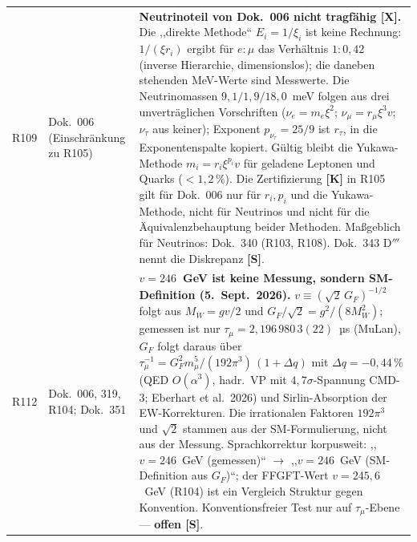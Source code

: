 \begin{longtable}{@{}p{0.9cm}p{3.1cm}p{10.2cm}@{}}
R109 & Dok.~006 (Einschränkung zu R105) & \textbf{Neutrinoteil von Dok.~006 nicht tragfähig [X].} Die ,,direkte Methode`` $E_i=1/\xi_i$ ist keine Rechnung: $1/(\xi r_i)$ ergibt für $e{:}\mu$ das Verhältnis $1{:}0{,}42$ (inverse Hierarchie, dimensionslos); die daneben stehenden MeV-Werte sind Messwerte. Die Neutrinomassen $9{,}1/1{,}9/18{,}0$~meV folgen aus drei unverträglichen Vorschriften ($\nu_e=m_e\xi^2$; $\nu_\mu=r_\mu\xi^3 v$; $\nu_\tau$ aus keiner); Exponent $p_{\nu_\tau}=25/9$ ist $r_\tau$, in die Exponentenspalte kopiert. Gültig bleibt die Yukawa-Methode $m_i=r_i\xi^{p_i}v$ für geladene Leptonen und Quarks ($<1{,}2\,\%$). Die Zertifizierung \textbf{[K]} in R105 gilt für Dok.~006 nur für $r_i,p_i$ und die Yukawa-Methode, nicht für Neutrinos und nicht für die Äquivalenzbehauptung beider Methoden. Maßgeblich für Neutrinos: Dok.~340 (R103, R108). Dok.~343 D$'''$ nennt die Diskrepanz \textbf{[S]}. \\
R112 & Dok.~006, 319, R104; Dok.~351 & \textbf{$v=246$~GeV ist keine Messung, sondern SM-Definition \QM{} (5.~Sept.~2026).} $v\equiv(\sqrt2\,G_F)^{-1/2}$ folgt aus $M_W=gv/2$ und $G_F/\sqrt2=g^2/(8M_W^2)$; gemessen ist nur $\tau_\mu=2{,}196\,980\,3(22)$~µs (MuLan), $G_F$ folgt daraus über $\tau_\mu^{-1}=G_F^2m_\mu^5/(192\pi^3)\,(1+\Delta q)$ mit $\Delta q=-0{,}44\,\%$ (QED $O(\alpha^3)$, hadr.\ VP mit $4{,}7\sigma$-Spannung CMD-3; Eberhart et al.\ 2026) und Sirlin-Absorption der EW-Korrekturen. Die irrationalen Faktoren $192\pi^3$ und $\sqrt2$ stammen aus der SM-Formulierung, nicht aus der Messung. Sprachkorrektur korpusweit: ,,$v=246$~GeV (gemessen)`` $\to$ ,,$v=246$~GeV (SM-Definition aus $G_F$)``; der FFGFT-Wert $v=245{,}6$~GeV (R104) ist ein Vergleich Struktur gegen Konvention. Konventionsfreier Test nur auf $\tau_\mu$-Ebene --- \textbf{offen [S]}. \\

\end{longtable}
